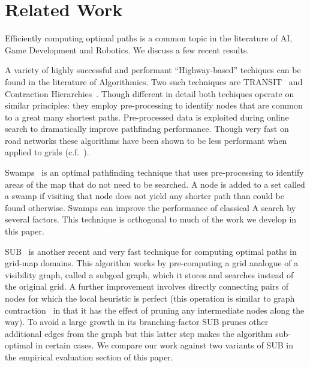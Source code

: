 \section{Related Work}
\label{sec::relatedwork}
Efficiently computing optimal paths is a common topic
in the literature of AI, Game Development and 
Robotics. We discuss a few recent results.

A variety of highly successful and performant ``Highway-based'' 
techiques can be found in the literature of Algorithmics. 
Two such techniques are TRANSIT~\cite{bast06} and Contraction
Hierarchies~\cite{geisberger08}. Though different in detail
both techiques operate on similar principles: they employ
pre-processing to identify nodes that
are common to a great many shortest paths. Pre-processed data is
exploited during online search to dramatically improve pathfindng 
performance. Though very fast on road networks these algorithms have
been shown to be less performant when applied to grids 
(c.f.~\cite{sturtevant10,antsfeld12}).

Swamps~\cite{pochter10} is an optimal pathfinding technique
that uses pre-processing to identify areas of the map that do 
not need to be searched. A node is added to a set called a swamp
if visiting that node does not yield any shorter path than could
be found otherwise. Swamps can improve the performance of classical
A\* search by several factors. This technique is orthogonal to much
of the work we develop in this paper.

SUB~\cite{urasKH13} is another recent and very fast technique 
for computing optimal paths in grid-map domains. 
This algorithm works by pre-computing a grid analogue of a visibility graph,
called a subgoal graph, which it stores and searches instead of the original
grid.
A further improvement involves directly connecting pairs of nodes
for which the local heuristic is perfect (this operation is similar 
to graph contraction~\cite{geisberger08} in that it has the effect of 
pruning any intermediate nodes along the way).
To avoid a large growth in its branching-factor SUB prunes other 
additional edges from the graph but this latter step makes the 
algorithm sub-optimal in certain cases. We compare our work against
two variants of SUB in the empirical evaluation section of this paper.

%
